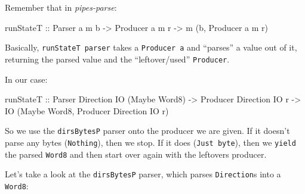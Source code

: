 \documentclass[]{article}
\newenvironment{Shaded}{}{}
\newcommand{\DataTypeTok}[1]{\textcolor[rgb]{0.56,0.13,0.00}{#1}}
\newcommand{\NormalTok}[1]{#1}
\newcommand{\OtherTok}[1]{\textcolor[rgb]{0.00,0.44,0.13}{#1}}
\begin{document}
Remember that in \emph{pipes-parse}:

\begin{Shaded}
\begin{Highlighting}[]
\OtherTok{runStateT ::} \DataTypeTok{Parser}\NormalTok{ a m b }\OtherTok{{-}>} \DataTypeTok{Producer}\NormalTok{ a m r }\OtherTok{{-}>}\NormalTok{ m (b, }\DataTypeTok{Producer}\NormalTok{ a m r)}
\end{Highlighting}
\end{Shaded}

Basically, \texttt{runStateT\ parser} takes a \texttt{Producer\ a} and
``parses'' a value out of it, returning the parsed value and the
``leftover/used'' \texttt{Producer}.

In our case:

\begin{Shaded}
\begin{Highlighting}[]
\OtherTok{runStateT ::} \DataTypeTok{Parser}   \DataTypeTok{Direction} \DataTypeTok{IO}\NormalTok{ (}\DataTypeTok{Maybe} \DataTypeTok{Word8}\NormalTok{)}
          \OtherTok{{-}>} \DataTypeTok{Producer} \DataTypeTok{Direction} \DataTypeTok{IO}\NormalTok{ r}
          \OtherTok{{-}>} \DataTypeTok{IO}\NormalTok{ (}\DataTypeTok{Maybe} \DataTypeTok{Word8}\NormalTok{, }\DataTypeTok{Producer} \DataTypeTok{Direction} \DataTypeTok{IO}\NormalTok{ r)}
\end{Highlighting}
\end{Shaded}

So we use the \texttt{dirsBytesP} parser onto the producer we are given. If it
doesn't parse any bytes (\texttt{Nothing}), then we stop. If it does
(\texttt{Just\ byte}), then we \texttt{yield} the parsed \texttt{Word8} and then
start over again with the leftovers producer.

Let's take a look at the \texttt{dirsBytesP} parser, which parses
\texttt{Direction}s into a \texttt{Word8}:
\end{document}
